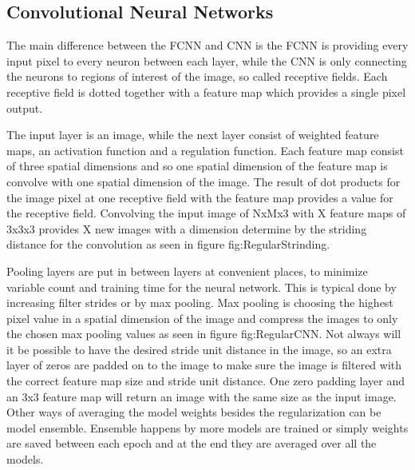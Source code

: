 \subsection{Convolutional Neural Networks}

The main difference between the FCNN and CNN is the FCNN is providing every input pixel to every neuron between each layer, while the CNN is only connecting the neurons to regions of interest of the image, so called receptive fields. Each receptive field is dotted together with a feature map which provides a single pixel output.

The input layer is an image, while the next layer consist of weighted feature maps, an activation function and a regulation function. Each feature map consist of three spatial dimensions and so one spatial dimension of the feature map is convolve with one spatial dimension of the image. The result of dot products for the image pixel at one receptive field with the feature map provides a value for the receptive field. Convolving the input image of NxMx3 with X feature maps of 3x3x3 provides X new images with a dimension determine by the striding distance for the convolution as seen in figure fig:RegularStrinding.

\FloatBarrier

Pooling layers are put in between layers at convenient places, to minimize variable count and training time for the neural network. This is typical done by increasing filter strides or by max pooling. Max pooling is choosing the highest pixel value in a spatial dimension of the image and compress the images to only the chosen max pooling values as seen in figure fig:RegularCNN. Not always will it be possible to have the desired stride unit distance in the image, so an extra layer of zeros are padded on to the image to make sure the image is filtered with the correct feature map size and stride unit distance. One zero padding layer and an 3x3 feature map will return an image with the same size as the input image. Other ways of averaging the model weights besides the regularization can be model ensemble. Ensemble happens by more models are trained or simply weights are saved between each epoch and at the end they are averaged over all the models.   

\FloatBarrier

